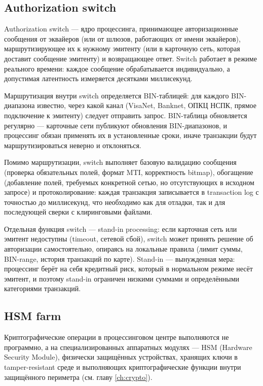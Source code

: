 \subsection*{Authorization switch}

Authorization switch — ядро процессинга, принимающее авторизационные сообщения  от эквайеров (или от шлюзов,
работающих от имени эквайеров), маршрутизирующее их к нужному эмитенту (или в карточную сеть, которая доставит
сообщение эмитенту) и возвращающее ответ. Switch работает в режиме реального времени: каждое сообщение обрабатывается
индивидуально, а допустимая латентность измеряется десятками миллисекунд.

Маршрутизация внутри switch определяется BIN-таблицей:
для каждого BIN-диапазона известно, через какой канал
(VisaNet, Banknet, ОПКЦ НСПК, прямое подключение к эмитенту)
следует отправить запрос. BIN-таблица обновляется регулярно —
карточные сети публикуют обновления BIN-диапазонов, и процессинг
обязан применять их в установленные сроки, иначе транзакции
будут маршрутизироваться неверно и отклоняться.

Помимо маршрутизации, switch выполняет базовую валидацию
сообщения (проверка обязательных полей, формат MTI, корректность
bitmap), обогащение (добавление полей, требуемых конкретной
сетью, но отсутствующих в исходном запросе) и протоколирование:
каждая транзакция записывается в transaction log с точностью
до миллисекунд, что необходимо как для отладки, так и для
последующей сверки с клиринговыми файлами.

Отдельная функция switch — stand-in processing: если карточная
сеть или эмитент недоступны (timeout, сетевой сбой), switch
может принять решение об авторизации самостоятельно, опираясь
на локальные правила (лимит суммы, BIN-range, история транзакций
по карте). Stand-in — вынужденная мера: процессинг берёт
на себя кредитный риск, который в нормальном режиме несёт
эмитент, и поэтому stand-in ограничен низкими суммами
и определёнными категориями транзакций.

\subsection*{HSM farm}

Криптографические операции в процессинговом центре выполняются
не программно, а на специализированных аппаратных модулях —
HSM (Hardware Security Module), физически защищённых устройствах,
хранящих ключи в tamper-resistant среде и выполняющих
криптографические функции внутри защищённого
периметра (см. главу \ref{ch:crypto}).

